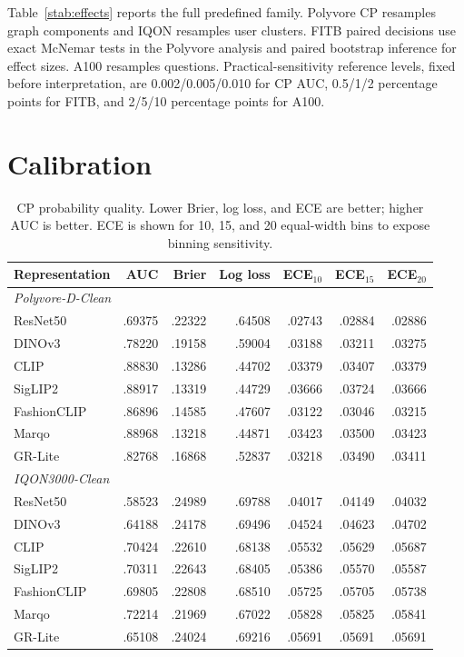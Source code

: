 \documentclass[preprint,12pt]{elsarticle}
\begin{document}
Table~\ref{stab:effects} reports the full predefined family. Polyvore CP resamples graph components and IQON resamples user clusters. FITB paired decisions use exact McNemar tests in the Polyvore analysis and paired bootstrap inference for effect sizes. A100 resamples questions. Practical-sensitivity reference levels, fixed before interpretation, are 0.002/0.005/0.010 for CP AUC, 0.5/1/2 percentage points for FITB, and 2/5/10 percentage points for A100.

\section{Calibration}

\begin{table}[htbp]
\caption{CP probability quality. Lower Brier, log loss, and ECE are better; higher AUC is better. ECE is shown for 10, 15, and 20 equal-width bins to expose binning sensitivity.}
\label{stab:calibration}
\centering\small
\setlength{\tabcolsep}{5pt}\renewcommand{\arraystretch}{1.04}
\begin{tabular}{lrrrrrr}
\toprule
Representation & AUC & Brier & Log loss & ECE$_{10}$ & ECE$_{15}$ & ECE$_{20}$ \\
\midrule
\multicolumn{7}{l}{\textit{Polyvore-D-Clean}} \\
ResNet50 & .69375 & .22322 & .64508 & .02743 & .02884 & .02886 \\
DINOv3 & .78220 & .19158 & .59004 & .03188 & .03211 & .03275 \\
CLIP & .88830 & .13286 & .44702 & .03379 & .03407 & .03379 \\
SigLIP2 & .88917 & .13319 & .44729 & .03666 & .03724 & .03666 \\
FashionCLIP & .86896 & .14585 & .47607 & .03122 & .03046 & .03215 \\
Marqo & .88968 & .13218 & .44871 & .03423 & .03500 & .03423 \\
GR-Lite & .82768 & .16868 & .52837 & .03218 & .03490 & .03411 \\
\midrule
\multicolumn{7}{l}{\textit{IQON3000-Clean}} \\
ResNet50 & .58523 & .24989 & .69788 & .04017 & .04149 & .04032 \\
DINOv3 & .64188 & .24178 & .69496 & .04524 & .04623 & .04702 \\
CLIP & .70424 & .22610 & .68138 & .05532 & .05629 & .05687 \\
SigLIP2 & .70311 & .22643 & .68405 & .05386 & .05570 & .05587 \\
FashionCLIP & .69805 & .22808 & .68510 & .05725 & .05705 & .05738 \\
Marqo & .72214 & .21969 & .67022 & .05828 & .05825 & .05841 \\
GR-Lite & .65108 & .24024 & .69216 & .05691 & .05691 & .05691 \\
\bottomrule
\end{tabular}
\end{table}
\end{document}
